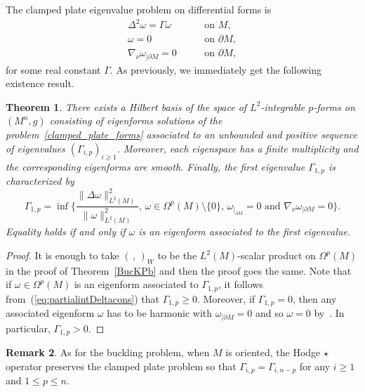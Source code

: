 \documentclass[pdftex]{sigma}
\numberwithin{equation}{section}
\newtheorem{Theorem}{Theorem}[section]
\theoremstyle{definition}
\newtheorem{Remark}[Theorem]{Remark}
\begin{document}
The clamped plate eigenvalue problem on differential forms is
\begin{equation}\label{clamped_plate_forms}
\begin{aligned}
&\Delta^2 \omega=\Gamma \omega \ \quad&&\textrm{on } M,\\
&\omega =0 \ \quad&&\textrm{on }\partial M,&\\
&\nabla_\nu\omega_{|\partial M}=0 \ \quad &&\textrm{on }\partial M,
\end{aligned}
\end{equation}
for some real constant $\Gamma$. As previously, we immediately get the following existence result.
\begin{Theorem}\label{CP_Pb}
There exists a Hilbert basis of the space of $L^2$-integrable $p$-forms on $(M^n,g)$ consisting of eigenforms solutions of the problem~\eqref{clamped_plate_forms} associated to an unbounded and positive sequence of eigenvalues $(\Gamma_{i,p})_{i\geq 1}$. Moreover, each eigenspace has a finite multiplicity and the corresponding eigenforms are smooth. Finally, the first eigenvalue $\Gamma_{1,p}$ is characterized by
\begin{equation}\label{eq:charcp}
\Gamma_{1,p}=\inf\Biggl\{\frac{\|\Delta\omega\|_{L^2(M)}^2}{
\| \omega\|_{L^2(M)}^2},\, \omega\in\Omega^p(M)\setminus\{0\},\, \omega_{|_{\partial
M}}=0\textrm{ and }\nabla_\nu\omega_{|\partial M}=0\Biggr\}.
\end{equation}
Equality holds if and only if $\omega$ is an eigenform associated to the first eigenvalue.
\end{Theorem}

\begin{proof} It is enough to take $(\,,\,)_W$ to be the $L^2(M)$-scalar product on $\Omega^p(M)$ in the proof of Theorem~\ref{BucKPb} and then the proof goes the same. Note that if $\omega\in\Omega^p(M)$ is an eigenform associated to $\Gamma_{1,p}$, it follows from~(\ref{eq:partialintDeltacons}) that $\Gamma_{1,p}\geq 0$. Moreover, if $\Gamma_{1,p}=0$, then any associated eigenform $\omega$ has to be harmonic with $\omega_{|\partial M}=0$ and so $\omega=0$ by~\cite{Anne89}. In particular, $\Gamma_{1,p}>0$.
\end{proof}

\begin{Remark}
As for the buckling problem, when $M$ is oriented, the Hodge $\star$ operator preserves the clamped plate problem so that $\Gamma_{i,p}=\Gamma_{i,n-p}$ for any $i\geq 1$ and $1\leq p\leq n$.
\end{Remark}
\end{document}
